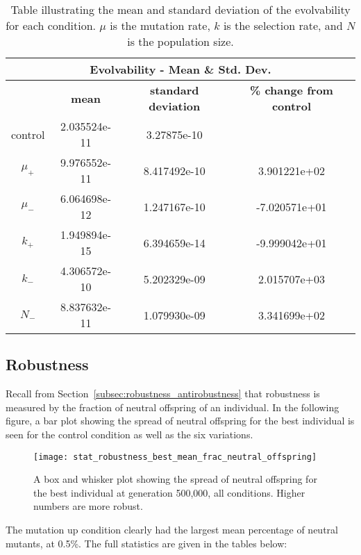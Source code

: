 \begin{table}[H]
	\centering
	\begin{tabular}{| c | c | c | c |}
		\hline
		\multicolumn{4}{c}{\Large Evolvability - Mean \& Std. Dev.} \\
		\hline
		& \textbf{mean} & \textbf{standard deviation} & \textbf{\% change from control} \\
		\hline
		\hline
		control & 2.035524e-11 & 3.27875e-10 & \textemdash \\ 
		\hline
		$\mu_+$ & 9.976552e-11 & 8.417492e-10 & 3.901221e+02 \\ 
		\hline
		$\mu_-$ & 6.064698e-12 & 1.247167e-10 & -7.020571e+01 \\ 
		\hline
		$k_+$ & 1.949894e-15 & 6.394659e-14 & -9.999042e+01 \\ 
		\hline
		$k_-$ & 4.306572e-10 & 5.202329e-09 & 2.015707e+03 \\ 
		\hline
		$N_-$ & 8.837632e-11 & 1.079930e-09 & 3.341699e+02 \\ 
		\hline	 		 
	\end{tabular}
	\caption[Evolvability mean and standard deviation]{Table illustrating the mean and standard deviation of the evolvability for each condition. $\mu$ is the mutation rate, $k$ is the selection rate, and $N$ is the population size.}
	\label{table:mean_std_dev_evolvability}
\end{table}

\subsection{Robustness}
Recall from Section~\ref{subsec:robustness_antirobustness} that robustness is measured by the fraction of neutral offspring of an individual. In the following figure, a bar plot showing the spread of neutral offspring for the best individual is seen for the control condition as well as the six variations. 

\begin{figure}[H]
	\centering
	\texttt{[image: stat\_robustness\_best\_mean\_frac\_neutral\_offspring]}
	\caption[Robustness box and whisker plot]{A box and whisker plot showing the spread of neutral offspring for the best individual at generation 500,000, all conditions. Higher numbers are more robust.}
	\label{fig:mean_robustness_all_conditions}
\end{figure}
The mutation up condition clearly had the largest mean percentage of neutral mutants, at 0.5\%. The full statistics are given in the tables below:

